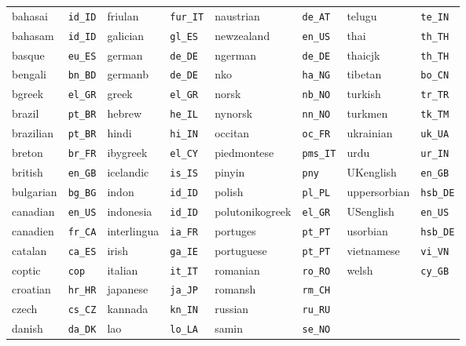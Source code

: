 \documentclass{ltxdockit}
\begin{document}
\begin{center}
\begin{tabular}{alalalal}
bahasai    & \texttt{id\_ID}  & friulan     & \texttt{fur\_IT} & naustrian       & \texttt{de\_AT} &   telugu          & \texttt{te\_IN}\\
bahasam    & \texttt{id\_ID}  & galician    & \texttt{gl\_ES}  & newzealand      & \texttt{en\_US} &   thai            & \texttt{th\_TH}\\
basque     & \texttt{eu\_ES}  & german      & \texttt{de\_DE}  & ngerman         & \texttt{de\_DE} &   thaicjk         & \texttt{th\_TH}\\
bengali    & \texttt{bn\_BD}  & germanb     & \texttt{de\_DE}  & nko             & \texttt{ha\_NG} &   tibetan         & \texttt{bo\_CN}\\
bgreek     & \texttt{el\_GR}  & greek       & \texttt{el\_GR}  & norsk           & \texttt{nb\_NO} &   turkish         & \texttt{tr\_TR}\\
brazil     & \texttt{pt\_BR}  & hebrew      & \texttt{he\_IL}  & nynorsk         & \texttt{nn\_NO} &   turkmen         & \texttt{tk\_TM}\\
brazilian  & \texttt{pt\_BR}  & hindi       & \texttt{hi\_IN}  & occitan         & \texttt{oc\_FR} &   ukrainian       & \texttt{uk\_UA}\\
breton     & \texttt{br\_FR}  & ibygreek    & \texttt{el\_CY}  & piedmontese     & \texttt{pms\_IT} &  urdu            & \texttt{ur\_IN}\\
british    & \texttt{en\_GB}  & icelandic   & \texttt{is\_IS}  & pinyin          & \texttt{pny} &      UKenglish       & \texttt{en\_GB}\\
bulgarian  & \texttt{bg\_BG}  & indon       & \texttt{id\_ID}  & polish          & \texttt{pl\_PL} &   uppersorbian    & \texttt{hsb\_DE}\\
canadian   & \texttt{en\_US}  & indonesia   & \texttt{id\_ID}  & polutonikogreek & \texttt{el\_GR} &   USenglish       & \texttt{en\_US}\\
canadien   & \texttt{fr\_CA}  & interlingua & \texttt{ia\_FR}  & portuges        & \texttt{pt\_PT} &   usorbian        & \texttt{hsb\_DE}\\
catalan    & \texttt{ca\_ES}  & irish       & \texttt{ga\_IE}  & portuguese      & \texttt{pt\_PT} &   vietnamese      & \texttt{vi\_VN}\\
coptic     & \texttt{cop}     & italian     & \texttt{it\_IT}  & romanian        & \texttt{ro\_RO} &   welsh           & \texttt{cy\_GB}\\
croatian   & \texttt{hr\_HR}  & japanese    & \texttt{ja\_JP}  & romansh         & \texttt{rm\_CH}\\
czech      & \texttt{cs\_CZ}  & kannada     & \texttt{kn\_IN}  & russian         & \texttt{ru\_RU}\\
danish     & \texttt{da\_DK}  & lao         & \texttt{lo\_LA}  & samin           & \texttt{se\_NO}\\
\bottomrule
\end{tabular}
\end{center}
\end{document}
